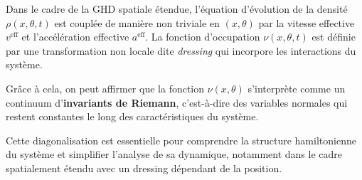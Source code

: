 \medskip

Dans le cadre de la GHD spatiale étendue, l'équation d'évolution de la densité \(\rho(x,\theta,t)\) est couplée de manière non triviale en \((x,\theta)\) par la vitesse effective \(v^{\mathrm{eff}}\) et l'accélération effective \(a^{\mathrm{eff}}\). La fonction d'occupation \(\nu(x,\theta,t)\) est définie par une transformation non locale dite \emph{dressing} qui incorpore les interactions du système.

\medskip

Grâce à cela, on peut affirmer que la fonction $\nu (x , \theta)$  s’interprète comme un continuum d’{\bf invariants de Riemann}, c’est-à-dire des variables normales qui restent constantes le long des caractéristiques du système.

\medskip

Cette diagonalisation est essentielle pour comprendre la structure hamiltonienne du système et simplifier l'analyse de sa dynamique, notamment dans le cadre spatialement étendu avec un dressing dépendant de la position. 






 






